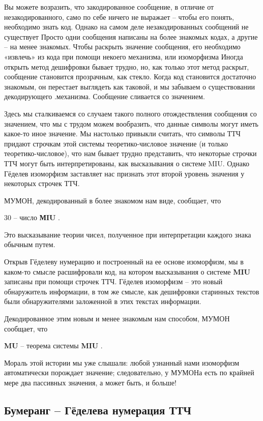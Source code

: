 \documentclass[../main.tex]{subfiles}
\begin{document}
Вы можете возразить, что закодированное сообщение, в отличие от незакодированного, само по себе ничего не выражает \--- чтобы его понять, необходимо знать код. Однако на самом деле незакодированных сообщений не существует Просто одни сообщения написаны на более знакомых кодах, а другие \--- на менее знакомых. Чтобы раскрыть значение сообщения, его необходимо «извлечь» из кода при помощи некоего механизма, или изоморфизма Иногда открыть метод дешифровки бывает трудно, но, как только этот метод раскрыт, сообщение становится прозрачным, как стекло. Когда код становится достаточно знакомым, он перестает выглядеть как таковой, и мы забываем о существовании декодирующего .механизма. Сообщение сливается со значением.

Здесь мы сталкиваемся со случаем такого полного отождествления сообщения со значением, что мы с трудом можем вообразить, что данные символы могут иметь какое-то иное значение. Мы настолько привыкли считать, что символы ТТЧ придают строчкам этой системы теоретико-числовое значение (и только теоретико-числовое), что нам бывает трудно представить, что некоторые строчки ТТЧ могут быть интерпретированы, как высказывания о системе MIU\@. Однако Гёделев изоморфизм заставляет нас признать этот второй уровень значения у некоторых строчек ТТЧ.

МУМОН, декодированный в более знакомом нам виде, сообщает, что

30 \--- число \textbf{МIU} .

Это высказывание теории чисел, полученное при интерпретации каждого знака обычным путем.

Открыв Гёделеву нумерацию и построенный на ее основе изоморфизм, мы в каком-то смысле расшифровали код, на котором высказывания о системе \textbf{MIU} записаны при помощи строчек ТТЧ\@. Гёделев изоморфизм \--- это новый обнаружитель информации, в том же смысле, как дешифровки старинных текстов были обнаружителями заложенной в этих текстах информации.

Декодированное этим новым и менее знакомым нам способом, МУМОН сообщает, что

\textbf{MU} \--- теорема системы \textbf{MIU} .

Мораль этой истории мы уже слышали: любой узнанный нами изоморфизм автоматически порождает значение; следовательно, у МУМОНа есть по крайней мере два пассивных значения, а может быть, и больше!


\subsection{Бумеранг \--- Гёделева нумерация ТТЧ}
\end{document}
